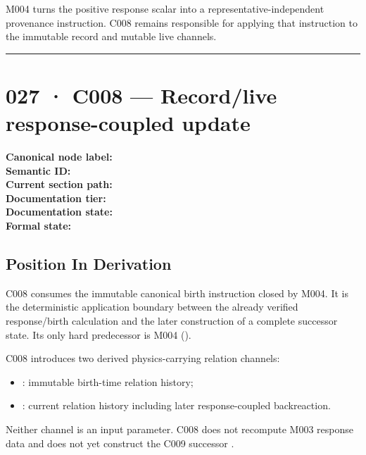 M004 turns the positive response scalar into a
representative-independent provenance instruction. C008 remains
responsible for applying that instruction to the immutable record and
mutable live channels.

\begin{center}\rule{0.5\linewidth}{0.5pt}\end{center}

\section{027 · C008 --- Record/live response-coupled
update}\label{c008-recordlive-response-coupled-update}

\textbf{Canonical node label:} \texttt{\protect{}}\\
\textbf{Semantic ID:} \texttt{\protect{}}\\
\textbf{Current section path:} \texttt{\protect{}}\\
\textbf{Documentation tier:} \texttt{\protect{}}\\
\textbf{Documentation state:} \texttt{\protect{}}\\
\textbf{Formal state:}
\texttt{\protect{}}

\subsection{Position In Derivation}\label{position-in-derivation-23}

C008 consumes the immutable canonical birth instruction closed by M004.
It is the deterministic application boundary between the already
verified response/birth calculation and the later construction of a
complete successor state. Its only hard predecessor is M004
(\texttt{\protect{}}).

C008 introduces two derived physics-carrying relation channels:

\begin{itemize}
\tightlist
\item
  \texttt{\protect{}}: immutable birth-time relation history;
\item
  \texttt{\protect{}}: current relation history including later
  response-coupled backreaction.
\end{itemize}

Neither channel is an input parameter. C008 does not recompute M003
response data and does not yet construct the C009 successor
\texttt{\protect{}}.

